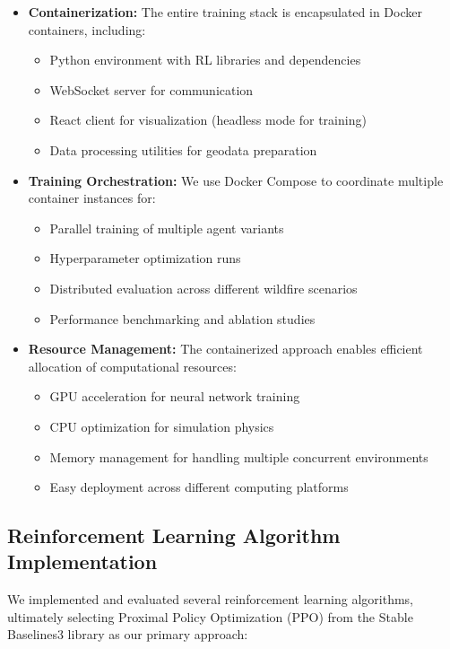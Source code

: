 \documentclass[conference]{IEEEtran}
\begin{document}
\begin{itemize}
    \item \textbf{Containerization:} The entire training stack is encapsulated in Docker containers, including:
    \begin{itemize}
        \item Python environment with RL libraries and dependencies
        \item WebSocket server for communication
        \item React client for visualization (headless mode for training)
        \item Data processing utilities for geodata preparation
    \end{itemize}
    
    \item \textbf{Training Orchestration:} We use Docker Compose to coordinate multiple container instances for:
    \begin{itemize}
        \item Parallel training of multiple agent variants
        \item Hyperparameter optimization runs
        \item Distributed evaluation across different wildfire scenarios
        \item Performance benchmarking and ablation studies
    \end{itemize}
    
    \item \textbf{Resource Management:} The containerized approach enables efficient allocation of computational resources:
    \begin{itemize}
        \item GPU acceleration for neural network training
        \item CPU optimization for simulation physics
        \item Memory management for handling multiple concurrent environments
        \item Easy deployment across different computing platforms
    \end{itemize}
\end{itemize}

\subsection{Reinforcement Learning Algorithm Implementation}

We implemented and evaluated several reinforcement learning algorithms, ultimately selecting Proximal Policy Optimization (PPO) from the Stable Baselines3 library as our primary approach:
\end{document}

